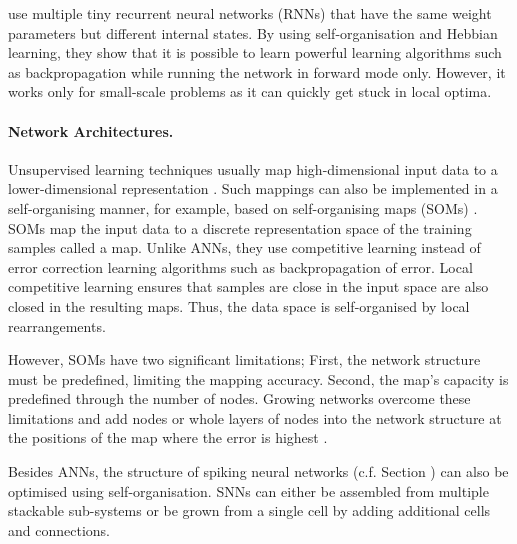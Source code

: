  use multiple tiny recurrent neural networks (RNNs) that have the same weight parameters but different internal states.
By using self-organisation and Hebbian learning, they show that it is possible to learn powerful learning algorithms such as backpropagation while running the network in forward mode only.
However, it works only for small-scale problems as it can quickly get stuck in local optima.



\paragraph{Network Architectures.}
Unsupervised learning techniques usually map high-dimensional input data to a lower-dimensional representation \cite{russell_artificial_2021}. Such mappings can also be implemented in a self-organising manner, for example, based on self-organising maps (SOMs) .
SOMs map the input data to a discrete representation space of the training samples called a map.
Unlike ANNs, they use competitive learning instead of error correction learning algorithms such as backpropagation of error.
Local competitive learning ensures that samples are close in the input space are also closed in the resulting maps.
Thus, the data space is self-organised by local rearrangements.

However, SOMs have two significant limitations; First, the network structure must be predefined, limiting the mapping accuracy. Second, the map's capacity is predefined through the number of nodes.
Growing networks overcome these limitations and add nodes or whole layers of nodes into the network structure at the positions of the map where the error is highest \cite{reilly_neural_1982, fritzke_growing_1994, marsland_self-organising_2002}.

Besides ANNs, the structure of spiking neural networks (c.f. Section ) can also be optimised using self-organisation. 
SNNs can either be assembled from multiple stackable sub-systems 
or be grown from a single cell \cite{raghavan_neural_2019} by adding additional cells and connections.

